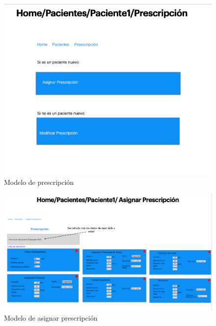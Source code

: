 \documentclass[12pt]{article}
\begin{document}
\begin{figure}[ht]
\centering
\includegraphics[scale=0.4]{imag/P6.png}
\caption{Modelo de prescripción  }
\label{58}
\end{figure}
\FloatBarrier


\begin{figure}[ht]
\centering
\includegraphics[scale=0.4]{imag/P7.png}
\caption{Modelo de asignar prescripción }
\label{59}
\end{figure}
\FloatBarrier
\end{document}
